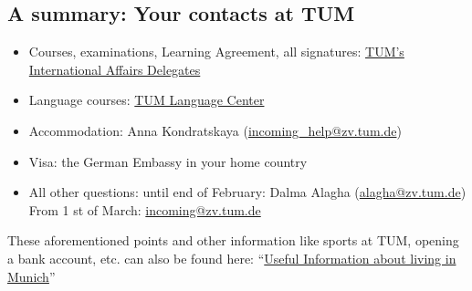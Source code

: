 \subsection{A summary: Your contacts at TUM}
\begin{itemize}
  \item Courses, examinations, Learning Agreement, all signatures: \href{http://www.international.tum.de/en/internationalaffairs/}{TUM's International Affairs Delegates}
  \item Language courses: \href{http://www.sprachenzentrum.tum.de/en/languages/german-as-a-foreign-language/}{TUM Language Center}
  \item Accommodation: Anna Kondratskaya (\href{mailto:incoming\_help@zv.tum.de}{incoming\_help@zv.tum.de})
  \item Visa: the German Embassy in your home country
  \item All other questions: until end of February: Dalma Alagha (\href{mailto:alagha@zv.tum.de}{alagha@zv.tum.de}) \\
  From 1 st of March: \href{mailto:incoming@zv.tum.de}{incoming@zv.tum.de}
\end{itemize}

These aforementioned points and other information like sports at TUM, opening a bank account, etc. can
also be found here: “\href{http://www.international.tum.de/en/welcome-to-tum/international-exchange-students/exchange-students/}{Useful Information about living in Munich}”